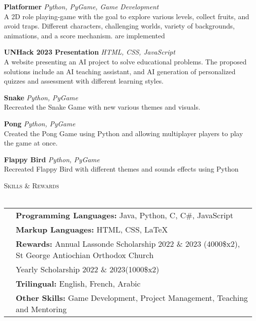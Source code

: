 \documentclass[a4paper]{article}
\newcommand{\lineunder} {
	\vspace*{-8pt} \\
	\hspace*{-18pt} \hrulefill \\
}
\newcommand{\header} [1] {
	{\hspace*{-18pt}\vspace*{6pt} \textsc{#1}}
	\vspace*{-6pt} \lineunder
}
\begin{document}
	{\textbf{Platformer \textbar{}}} {\sl Python, PyGame, Game Development} \\
	A 2D role playing-game with the goal to explore various levels, collect fruits, and avoid traps. Different characters, challenging worlds, variety of backgrounds, animations, and a score mechanism. are implemented\\
	\vspace*{2mm}

	{\textbf{UNHack 2023 Presentation \textbar{}}} {\sl HTML, CSS, JavaScript} \\
	A website presenting an AI project to solve educational problems. The proposed solutions include an AI teaching assistant, and AI generation of personalized quizzes and assessment with different learning styles.\\
	\vspace*{2mm}

	{\textbf{Snake \textbar{}}} {\sl Python, PyGame} \\
	Recreated the Snake Game with new various themes and visuals.\\
	\vspace*{2mm}

	{\textbf{Pong \textbar{}}} {\sl Python, PyGame} \\
	Created the Pong Game using Python and allowing multiplayer players to play the game at once.\\
	\vspace*{2mm}

	{\textbf{Flappy Bird \textbar{}}} {\sl Python, PyGame} \\
	Recreated Flappy Bird with different themes and sounds effects using Python\\
	\vspace*{2mm}
	
	\header{Skills \& Rewards}
	\begin{tabular}{ l l }
		\vspace{1mm}
		&\textbf{Programming Languages:} Java, Python, C, C\#, JavaScript \\
		\vspace{1mm}
		&\textbf{Markup Languages:} HTML, CSS, LaTeX \\
		&\textbf{Rewards:} Annual Lassonde Scholarship 2022 \& 2023 (4000\$x2), St George Antiochian Orthodox Church \\
		\vspace{1mm}
		&\hspace{16.5mm} Yearly Scholarship 2022 \& 2023(1000\$x2)\\
		\vspace{1mm}
		&\textbf{Trilingual:} English, French, Arabic \\
		&\textbf{Other Skills:} Game Development, Project Management, Teaching and Mentoring \\
	\end{tabular}
	\vspace{2mm}
	
\end{document}
